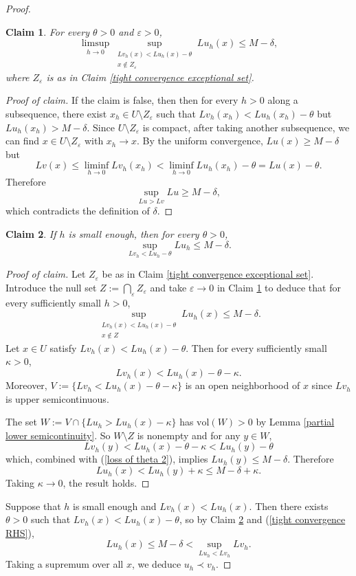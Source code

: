 \documentclass[reqno,11pt]{amsart}
\newcommand{\vol}{\mathrm{vol}}
\newtheorem{claim}{Claim}[theorem]
\theoremstyle{definition}
\numberwithin{equation}{section}
\begin{document}
\begin{proof}
\begin{claim}\label{loss of epsilon}
For every $\theta > 0$ and $\varepsilon > 0$,
$$\limsup_{h \to 0} \sup_{\substack{Lv_h(x) < Lu_h(x) - \theta \\ x \notin Z_\varepsilon}} Lu_h(x) \leq M - \delta,$$
where $Z_\varepsilon$ is as in Claim \ref{tight convergence exceptional set}.
\end{claim}
\begin{proof}[Proof of claim]
If the claim is false, then then for every $h > 0$ along a subsequence, there exist $x_h \in U \setminus Z_\varepsilon$ such that $Lv_h(x_h) < Lu_h(x_h) - \theta$ but $Lu_h(x_h) > M - \delta$.
Since $U \setminus Z_\varepsilon$ is compact, after taking another subsequence, we can find $x \in U \setminus Z_\varepsilon$ with $x_h \to x$.
By the uniform convergence, $Lu(x) \geq M - \delta$ but 
$$Lv(x) \leq \liminf_{h \to 0} Lv_h(x_h) < \liminf_{h \to 0} Lu_h(x_h) - \theta = Lu(x) - \theta.$$
Therefore 
$$\sup_{Lu > Lv} Lu \geq M - \delta,$$
which contradicts the definition of $\delta$.
\end{proof}

\begin{claim}\label{LHS claim}
If $h$ is small enough, then for every $\theta > 0$,
$$\sup_{Lv_h < Lu_h - \theta} Lu_h \leq M - \delta.$$
\end{claim}
\begin{proof}[Proof of claim]
Let $Z_\varepsilon$ be as in Claim \ref{tight convergence exceptional set}.
Introduce the null set $Z := \bigcap_\varepsilon Z_\varepsilon$ and take $\varepsilon \to 0$ in Claim \ref{loss of epsilon} to deduce that for every sufficiently small $h > 0$,
\begin{equation}\label{loss of theta 2}
\sup_{\substack{Lv_h(x) < Lu_h(x) - \theta \\ x \notin Z}} Lu_h(x) \leq M - \delta.
\end{equation}
Let $x \in U$ satisfy $Lv_h(x) < Lu_h(x) - \theta$.
Then for every sufficiently small $\kappa > 0$,
$$Lv_h(x) < Lu_h(x) - \theta - \kappa.$$
Moreover, $V := \{Lv_h < Lu_h(x) - \theta - \kappa\}$ is an open neighborhood of $x$ since $Lv_h$ is upper semicontinuous.

The set $W := V \cap \{Lu_h > Lu_h(x) - \kappa\}$ has $\vol(W) > 0$ by Lemma \ref{partial lower semicontinuity}.
So $W \setminus Z$ is nonempty and for any $y \in W$,
$$Lv_h(y) < Lu_h(x) - \theta - \kappa < Lu_h(y) - \theta$$
which, combined with (\ref{loss of theta 2}), implies $Lu_h(y) \leq M - \delta$.
Therefore
$$Lu_h(x) < Lu_h(y) + \kappa \leq M - \delta + \kappa.$$
Taking $\kappa \to 0$, the result holds.
\end{proof}

Suppose that $h$ is small enough and $Lv_h(x) < Lu_h(x)$.
Then there exists $\theta > 0$ such that $Lv_h(x) < Lu_h(x) - \theta$, so by Claim \ref{LHS claim} and (\ref{tight convergence RHS}),
$$Lu_h(x) \leq M - \delta < \sup_{Lu_h < Lv_h} Lv_h.$$
Taking a supremum over all $x$, we deduce $u_h \prec v_h$.
\end{proof}
\end{document}
